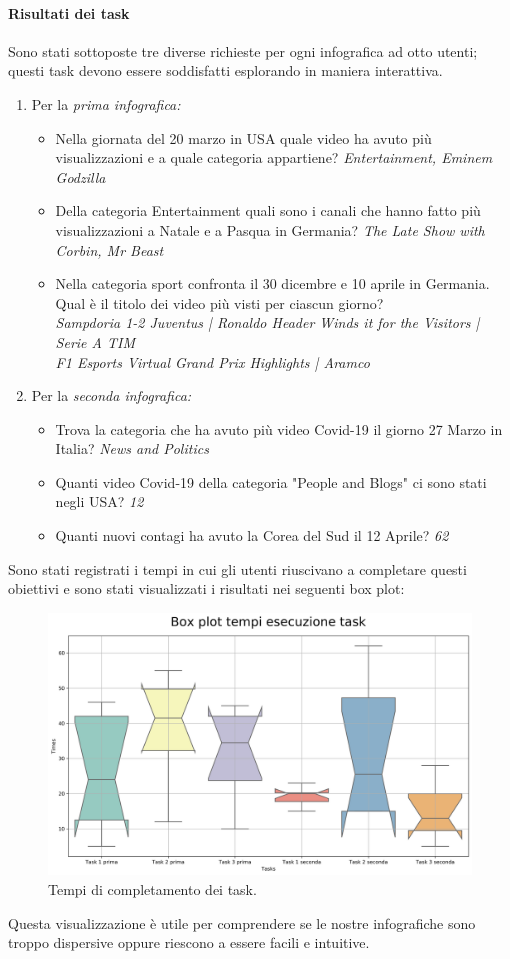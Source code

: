 \documentclass[10pt, a4paper,openany]{article}
\begin{document}
\paragraph{Risultati dei task} Sono stati sottoposte tre diverse richieste per ogni infografica ad otto utenti; questi task devono essere soddisfatti esplorando in maniera interattiva.
\begin{enumerate}
	\item Per la \textit{prima infografica:}
	\begin{itemize}
		\item Nella giornata del 20 marzo in USA quale video ha avuto più visualizzazioni e a quale categoria appartiene?  \textit{Entertainment, Eminem Godzilla}
		\item Della categoria Entertainment quali sono i canali che hanno fatto più visualizzazioni a Natale e a Pasqua in Germania? \textit{The Late Show with Corbin, Mr Beast}
		\item Nella categoria sport confronta il 30 dicembre e 10 aprile in Germania. Qual è il titolo dei video più visti per ciascun giorno?\\
		\textit{Sampdoria 1-2 Juventus | Ronaldo Header Winds it for the Visitors | Serie A TIM \\ F1 Esports Virtual Grand Prix Highlights | Aramco}
	\end{itemize}
	\item Per la \textit{seconda infografica:}
\begin{itemize}
	\item Trova la categoria che ha avuto più video Covid-19 il giorno 27 Marzo in Italia? \textit{News and Politics}
	\item Quanti video Covid-19 della categoria "People and Blogs" ci sono stati negli USA? \textit{12}
	\item Quanti nuovi contagi ha avuto la Corea del Sud il 12 Aprile? \textit{62}
\end{itemize}
\end{enumerate}

Sono stati registrati i tempi in cui gli utenti riuscivano a completare questi obiettivi e sono stati visualizzati i risultati nei seguenti box plot:
\begin{figure}[H]
	\centering
	\includegraphics[height=0.5 \linewidth]{../quality/tempi_box_plot_seaborn.png}
	\caption{Tempi di completamento dei task.}
\end{figure}
Questa visualizzazione è utile per comprendere se le nostre infografiche sono troppo dispersive oppure riescono a essere facili e intuitive.
\end{document}
